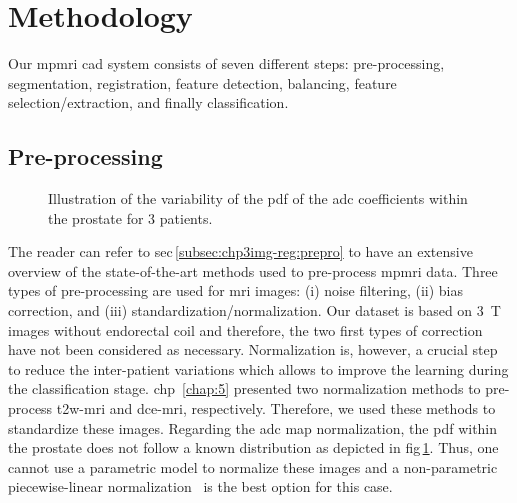 \section{Methodology}\label{sec:chp6:method}

Our \ac{mpmri} \ac{cad} system consists of seven different steps: pre-processing, segmentation, registration, feature detection, balancing, feature selection/extraction, and finally classification.

\subsection{Pre-processing}\label{subsec:chp6:method:PP}

\begin{figure}
  \hspace*{\fill}
  \hfill
  \hfill
  \hspace*{\fill}
  \caption[Illustration of the \acs*{pdf} of the \acs*{adc} coefficients within the prostate.]{Illustration of the variability of the \acs*{pdf} of the \acs*{adc} coefficients within the prostate for 3 patients.}
  \label{fig:adcpdf}
\end{figure}


The reader can refer to \acs{sec}\,\ref{subsec:chp3img-reg:prepro} to have an extensive overview of the state-of-the-art methods used to pre-process \ac{mpmri} data.
Three types of pre-processing are used for \ac{mri} images: (i) noise filtering, (ii) bias correction, and (iii) standardization/normalization.
Our dataset is based on \SI{3}{\tesla} images without endorectal coil and therefore, the two first types of correction have not been considered as necessary.
Normalization is, however, a crucial step to reduce the inter-patient variations which allows to improve the learning during the classification stage.
\Ac{chp}~\ref{chap:5} presented two normalization methods to pre-process \ac{t2w}-\ac{mri} and \ac{dce}-\ac{mri}, respectively.
Therefore, we used these methods to standardize these images.
Regarding the \ac{adc} map normalization, the \ac{pdf} within the prostate does not follow a known distribution as depicted in \acs{fig}\,\ref{fig:adcpdf}.
Thus, one cannot use a parametric model to normalize these images and a non-parametric piecewise-linear normalization~\cite{Nyul2000} is the best option for this case.

